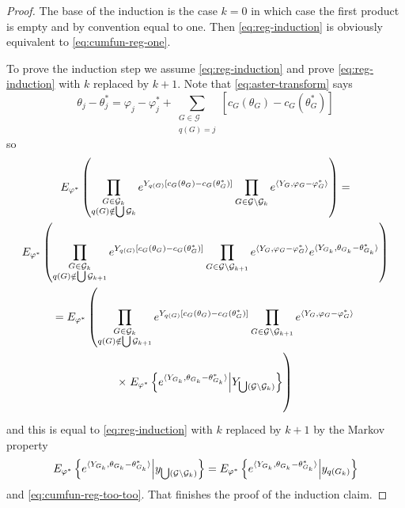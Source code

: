 \begin{proof}
The base of the induction is the case $k = 0$ in which case the
first product is empty and by convention equal to one.
Then \eqref{eq:reg-induction} is obviously equivalent
to \eqref{eq:cumfun-reg-one}.

To prove the induction step we assume \eqref{eq:reg-induction}
and prove \eqref{eq:reg-induction} with $k$ replaced by $k + 1$.
Note that \eqref{eq:aster-transform} says
\begin{equation} \label{eq:reg-aster-transform}
   \theta_j - \theta_j^*
   =
   \varphi_j - \varphi_j^*
   +
   \sum_{\substack{G \in \mathcal{G} \\ q(G) = j}}
   [ c_G(\theta_G) - c_G(\theta_G^*) ]
\end{equation}
so
\begin{multline*}
   E_{\varphi^*}\left(
   \prod_{\substack{G \in \mathcal{G}_k \\ q(G) \notin \bigcup \mathcal{G}_k}}
   e^{Y_{q(G)} [c_G(\theta_G) - c_G(\theta_G^*)]}
   \prod_{G \in \mathcal{G} \setminus \mathcal{G}_k}
   e^{\inner{Y_G, \varphi_G - \varphi_G^*}}
   \right)
   =
   \\
   E_{\varphi^*}\left(
   \prod_{\substack{G \in \mathcal{G}_k \\
       q(G) \notin \bigcup \mathcal{G}_{k + 1}}}
   e^{Y_{q(G)} [c_G(\theta_G) - c_G(\theta_G^*)]}
   \prod_{G \in \mathcal{G} \setminus \mathcal{G}_{k + 1}}
   e^{\inner{Y_G, \varphi_G - \varphi_G^*}}
   e^{\inner{Y_{G_k}, \theta_{G_k} - \theta_{G_k}^*}}
   \right)
   \\
   =
   E_{\varphi^*}\left(
   \prod_{\substack{G \in \mathcal{G}_k \\
       q(G) \notin \bigcup \mathcal{G}_{k + 1}}}
   e^{Y_{q(G)} [c_G(\theta_G) - c_G(\theta_G^*)]}
   \prod_{G \in \mathcal{G} \setminus \mathcal{G}_{k + 1}}
   e^{\inner{Y_G, \varphi_G - \varphi_G^*}}
   \right.
   \\
   \times
   \left.
   \vphantom{\prod_{\substack{G \in \mathcal{G}_{k + 1} \\
       q(G) \notin \bigcup \mathcal{G}_{k + 1}}}}
   E_{\varphi^*}\left\{
   e^{\inner{Y_{G_k}, \theta_{G_k} - \theta_{G_k}^*}}
   \middle| Y_{\bigcup (\mathcal{G} \setminus \mathcal{G}_k)}
   \right\}
   \right)
\end{multline*}
and this is equal to \eqref{eq:reg-induction} with $k$ replaced by $k + 1$
by the Markov property
$$
   E_{\varphi^*}\left\{
   e^{\langle Y_{G_k}, \theta_{G_k} - \theta_{G_k}^* \rangle}
   \middle| y_{\bigcup (\mathcal{G} \setminus \mathcal{G}_k)}
   \right\}
   =
   E_{\varphi^*}\left\{
   e^{\langle Y_{G_k}, \theta_{G_k} - \theta_{G_k}^* \rangle}
   \middle| y_{q(G_k)}
   \right\}
$$
and \eqref{eq:cumfun-reg-too-too}.
That finishes the proof of the induction claim.


\end{proof}
